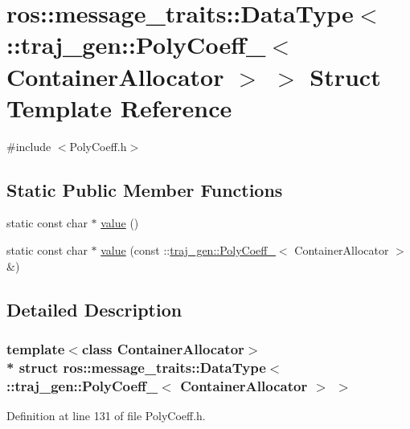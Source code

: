 \hypertarget{structros_1_1message__traits_1_1_data_type_3_01_1_1traj__gen_1_1_poly_coeff___3_01_container_allocator_01_4_01_4}{}\section{ros\+:\+:message\+\_\+traits\+:\+:Data\+Type$<$ \+:\+:traj\+\_\+gen\+:\+:Poly\+Coeff\+\_\+$<$ Container\+Allocator $>$ $>$ Struct Template Reference}
\label{structros_1_1message__traits_1_1_data_type_3_01_1_1traj__gen_1_1_poly_coeff___3_01_container_allocator_01_4_01_4}


{\ttfamily \#include $<$Poly\+Coeff.\+h$>$}

\subsection*{Static Public Member Functions}
\begin{DoxyCompactItemize}
\item 
static const char $\ast$ \hyperlink{structros_1_1message__traits_1_1_data_type_3_01_1_1traj__gen_1_1_poly_coeff___3_01_container_allocator_01_4_01_4_a16041f2837db5beeeeaad29c19ab1e09}{value} ()
\item 
static const char $\ast$ \hyperlink{structros_1_1message__traits_1_1_data_type_3_01_1_1traj__gen_1_1_poly_coeff___3_01_container_allocator_01_4_01_4_a785e6d39c2c99e53bbb56485af512bec}{value} (const \+::\hyperlink{structtraj__gen_1_1_poly_coeff__}{traj\+\_\+gen\+::\+Poly\+Coeff\+\_\+}$<$ Container\+Allocator $>$ \&)
\end{DoxyCompactItemize}


\subsection{Detailed Description}
\subsubsection*{template$<$class Container\+Allocator$>$\\*
struct ros\+::message\+\_\+traits\+::\+Data\+Type$<$ \+::traj\+\_\+gen\+::\+Poly\+Coeff\+\_\+$<$ Container\+Allocator $>$ $>$}



Definition at line 131 of file Poly\+Coeff.\+h.



